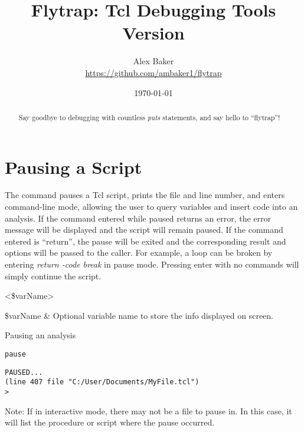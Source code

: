\documentclass{article}
\title{\Huge Flytrap: Tcl Debugging Tools\\\small Version \version}
\author{Alex Baker\\\small\url{https://github.com/ambaker1/flytrap}}
\date{\small\today}
\renewcommand{\^}[1]{\textsuperscript{#1}}
\renewcommand{\_}[1]{\textsubscript{#1}}
\begin{document}
\maketitle
\begin{abstract}
\begin{center}
Say goodbye to debugging with countless \textit{puts} statements, and say hello to ``flytrap''!
\end{center}
\end{abstract}
\clearpage
\section{Pausing a Script} 
The  command pauses a Tcl script, prints the file and line number, and enters command-line mode, allowing the user to query variables and insert code into an analysis. 
If the command entered while paused returns an error, the error message will be displayed and the script will remain paused. 
If the command entered is ``return'', the pause will be exited and the corresponding result and options will be passed to the caller. 
For example, a loop can be broken by entering \textit{return -code break} in pause mode. 
Pressing enter with no commands will simply continue the script.
\begin{syntax}
 <\$varName>
\end{syntax}
\begin{args}
\$varName & Optional variable name to store the info displayed on screen.
\end{args}
\begin{example}{Pausing an analysis}
\begin{lstlisting}
pause
\end{lstlisting}
\tcblower
\begin{lstlisting}
PAUSED...
(line 407 file "C:/User/Documents/MyFile.tcl")
> 
\end{lstlisting}
\end{example}
Note: If in interactive mode, there may not be a file to pause in. 
In this case, it will list the procedure or script where the pause occurred.
\clearpage
\end{document}
